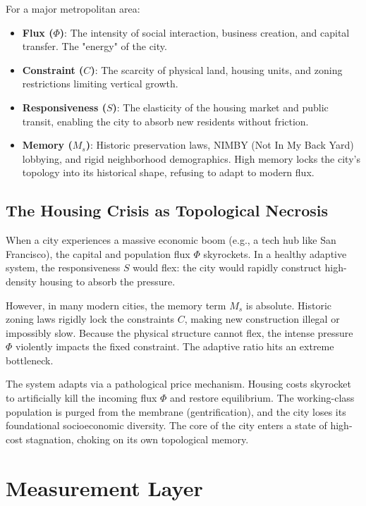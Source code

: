 \documentclass[11pt,a4paper]{article}
\begin{document}
For a major metropolitan area:
\begin{itemize}
    \item \textbf{Flux ($\Phi$)}: The intensity of social interaction, business creation, and capital transfer. The "energy" of the city.
    \item \textbf{Constraint ($C$)}: The scarcity of physical land, housing units, and zoning restrictions limiting vertical growth.
    \item \textbf{Responsiveness ($S$)}: The elasticity of the housing market and public transit, enabling the city to absorb new residents without friction.
    \item \textbf{Memory ($M_s$)}: Historic preservation laws, NIMBY (Not In My Back Yard) lobbying, and rigid neighborhood demographics. High memory locks the city's topology into its historical shape, refusing to adapt to modern flux.
\end{itemize}

\subsection{The Housing Crisis as Topological Necrosis}
When a city experiences a massive economic boom (e.g., a tech hub like San Francisco), the capital and population flux $\Phi$ skyrockets. In a healthy adaptive system, the responsiveness $S$ would flex: the city would rapidly construct high-density housing to absorb the pressure.

However, in many modern cities, the memory term $M_s$ is absolute. Historic zoning laws rigidly lock the constraints $C$, making new construction illegal or impossibly slow. Because the physical structure cannot flex, the intense pressure $\Phi$ violently impacts the fixed constraint. The adaptive ratio hits an extreme bottleneck.

The system adapts via a pathological price mechanism. Housing costs skyrocket to artificially kill the incoming flux $\Phi$ and restore equilibrium. The working-class population is purged from the membrane (gentrification), and the city loses its foundational socioeconomic diversity. The core of the city enters a state of high-cost stagnation, choking on its own topological memory.



\section{Measurement Layer}
\end{document}
